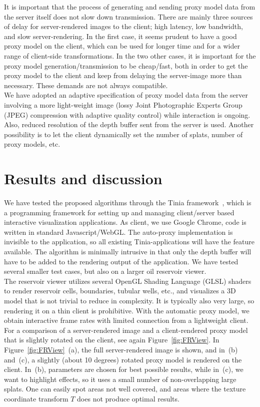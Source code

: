 \documentclass[10pt,conference,compsocconf]{IEEEtran}
\begin{document}
It is important that the process of generating and sending proxy model data from
the server itself does not slow down transmission.  There are mainly three
sources of delay for server-rendered images to the client; high latency, low
bandwidth, and slow server-rendering.  In the first case, it seems prudent to
have a good proxy model on the client, which can be used for longer time and for
a wider range of client-side transformations.  In the two other cases, it is
important for the proxy model generation/transmission to be cheap/fast, both in order
to get the proxy model to the client and keep from delaying the server-image
more than necessary. These demands are not always compatible.
\\
We have adopted an adaptive specification of proxy model data from the server
involving a more light-weight image (lossy Joint Photographic Experts Group
(JPEG) compression with adaptive quality control) while interaction is ongoing.
Also, reduced resolution of the depth buffer sent from the server is
used. Another possibility is to let the client dynamically set the number of
splats, number of proxy models, etc.


\section{Results and discussion}
\label{sec:results}

We have tested the proposed algorithms through the Tinia 
framework~\cite{tinia}, which is a programming framework for
setting up and managing client/server based interactive visualization
applications. As client, we use Google Chrome, code is written
in standard Javascript/WebGL.  The auto-proxy implementation is invisible to the
application, so all existing Tinia-applications will have the feature
available. The algorithm is minimally intrusive in that only the depth buffer
will have to be added to the rendering output of the application. We have tested
several smaller test cases, but also on a larger oil reservoir viewer.
\\
The reservoir viewer utilizes several OpenGL Shading Language (GLSL) shaders to
render reservoir cells, boundaries, tubular wells, etc., and visualizes a 3D
model that is not trivial to reduce in complexity. It is typically also very
large, so rendering it on a thin client is prohibitive. With the automatic proxy
model, we obtain interactive frame rates with limited connection from a
lightweight client. For a comparison of a server-rendered image and a
client-rendered proxy model that is slightly rotated on the client, see again
Figure~\ref{fig:FRView}. In Figure~\ref{fig:FRView}~(a), the full
server-rendered image is shown, and in~(b) and~(c), a slightly (about 10
degrees) rotated proxy model is rendered on the client. In~(b), parameters are
chosen for best possible results, while in~(c), we want to highlight effects, so
it uses a small number of non-overlapping large splats. One can easily spot
areas not well covered, and areas where the texture coordinate transform $T$
does not produce optimal results.
\end{document}

